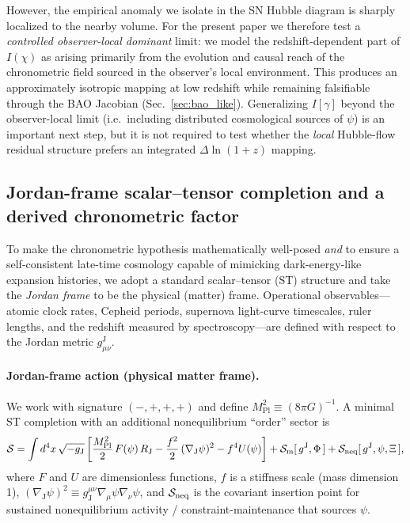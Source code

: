 \documentclass[10pt]{article}
\newcommand{\gJ}{g^{\mathrm{J}}}        %
\newcommand{\Mp}{M_{\mathrm{Pl}}}
\newcommand{\Fpsi}{F(\psi)}
\newcommand{\Upsi}{U(\psi)}
\begin{document}
However, the empirical anomaly we isolate in the SN Hubble diagram is sharply localized to the
nearby volume. For the present paper we therefore test a \emph{controlled observer-local dominant}
limit: we model the redshift-dependent part of \(I(\chi)\) as arising primarily from the evolution
and causal reach of the chronometric field sourced in the observer’s local environment. This
produces an approximately isotropic mapping at low redshift while remaining falsifiable through the
BAO Jacobian (Sec.~\ref{sec:bao_like}). Generalizing \(I[\gamma]\) beyond the observer-local limit
(i.e.\ including distributed cosmological sources of \(\psi\)) is an important next step, but it is
not required to test whether the \emph{local} Hubble-flow residual structure prefers an integrated
\(\Delta\ln(1+z)\) mapping.


\subsection{Jordan-frame scalar--tensor completion and a derived chronometric factor}
\label{sec:conformal_completion}

To make the chronometric hypothesis mathematically well-posed \emph{and} to ensure a self-consistent
late-time cosmology capable of mimicking dark-energy-like expansion histories, we adopt a standard
scalar--tensor (ST) structure and take the \emph{Jordan frame} to be the physical (matter) frame.
Operational observables---atomic clock rates, Cepheid periods, supernova light-curve timescales,
ruler lengths, and the redshift measured by spectroscopy---are defined with respect to the Jordan
metric $\gJ_{\mu\nu}$.

\paragraph{Jordan-frame action (physical matter frame).}
We work with signature $(-,+,+,+)$ and define $\Mp^{2}\equiv(8\pi G)^{-1}$.
A minimal ST completion with an additional nonequilibrium ``order'' sector is
\begin{equation}
\mathcal{S}
=
\int d^4x\,\sqrt{-g_{\mathrm{J}}}\left[
\frac{\Mp^{2}}{2}\,\Fpsi\,R_{\mathrm{J}}
-\frac{f^{2}}{2}\,(\nabla_{\mathrm{J}}\psi)^2
-f^{4}\Upsi
\right]
+\mathcal{S}_{\rm m}[\,\gJ,\Phi\,]
+\mathcal{S}_{\rm neq}[\,\gJ,\psi,\Xi\,],
\label{eq:JF_action}
\end{equation}
where $F$ and $U$ are dimensionless functions, $f$ is a stiffness scale (mass dimension 1),
$(\nabla_{\mathrm{J}}\psi)^2\equiv g_{\mathrm{J}}^{\mu\nu}\nabla_\mu\psi\nabla_\nu\psi$, and
$\mathcal{S}_{\rm neq}$ is the covariant insertion point for sustained nonequilibrium activity /
constraint-maintenance that sources $\psi$.
\end{document}
